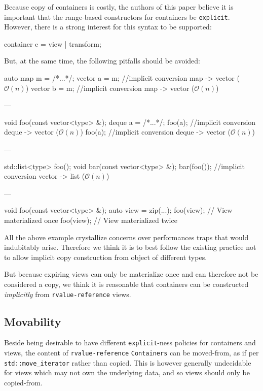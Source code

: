 \documentclass{wg21}
\newcommand{\cc}[1]{\texttt{#1}}
\begin{document}
Because copy of containers is costly, the authors of this paper believe it is important that the range-based constructors for containers be \cc{explicit}.
However, there is a strong interest for this syntax to be supported:
\begin{codeblock}
	container c = view | transform;
\end{codeblock}

But, at the same time, the following pitfalls should be avoided:


\begin{codeblock}
	auto map m = /*...*/;
	vector a = m;  //implicit conversion map -> vector ($\mathcal{O}(n)$)
	vector b = m;  //implicit conversion map -> vector ($\mathcal{O}(n)$)
\end{codeblock}
---

\begin{codeblock}
	void foo(const vector<type> &);
	deque a =  /*...*/;
	foo(a);  //implicit conversion deque -> vector ($\mathcal{O}(n)$)
	foo(a);  //implicit conversion deque -> vector ($\mathcal{O}(n)$)
\end{codeblock}
---

\begin{codeblock}
	std::list<type> foo(); 
	void bar(const vector<type> &);
	bar(foo()); //implicit conversion vector -> list ($\mathcal{O}(n)$)
\end{codeblock}
---

\begin{codeblock}
	void foo(const vector<type> &); 
	auto view = zip(...);
	foo(view); // View materialized once
	foo(view); // View materialized twice
\end{codeblock}

All the above example crystallize concerns over performances traps that would indubitably arise.
Therefore we think it is to best follow the existing practice not to allow implicit copy construction from object of different types.

But because expiring views can only be materialize once and can therefore not be considered a copy, we think it is reasonable that
containers can be constructed \emph{implicitly} from \cc{rvalue-reference} views.

\subsection{Movability}

Beside being desirable to have different \cc{explicit}-ness policies for containers and views, the content of \cc{rvalue-reference} \cc{Containers}
can be moved-from, as if per \cc{std::move_iterator} rather than copied.
This is however generally undecidable for views which may not own the underlying data, and so views should only be copied-from.
\end{document}

